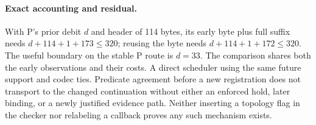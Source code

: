 \documentclass{article}
\begin{document}
\paragraph{Exact accounting and residual.}
With P's prior debit $d$ and header of 114 bytes, its early byte plus
full suffix needs $d+114+1+173\le320$; reusing the byte needs
$d+114+1+172\le320$. The useful boundary on the stable P route is
$d=33$. The comparison shares both the early observations and their
costs. A direct scheduler using the same future support and codec ties.
Predicate agreement before a new registration does not transport to the
changed continuation without either an enforced hold, later binding, or a
newly justified evidence path. Neither inserting a topology flag in the
checker nor relabeling a callback proves any such mechanism exists.
\end{document}
